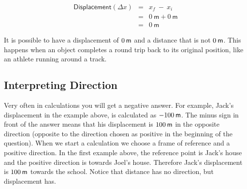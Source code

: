 \begin{minipage}{0.5\textwidth}
\begin{eqnarray*}
\mathsf{Displacement} (\Delta x) &=& x_f~ - ~ x_i\\
&=&0\ \mathsf{m} + 0\ \mathsf{m}\\
&=&0\ \mathsf{m}
\end{eqnarray*}
\end{minipage} 
      \label{m38788*id63886}It is possible to have a displacement of $0\phantom{\rule{2pt}{0ex}}\mathsf{m}$ and a distance that is not $0\phantom{\rule{2pt}{0ex}}\mathsf{m}$. This happens when an object completes a round trip back to its original position, like an athlete running around a track.\par 
      \label{m38788*uid18}
            \subsection*{Interpreting Direction}
            \nopagebreak
        \label{m38788*id63901}Very often in calculations you will get a negative answer. For example, Jack's displacement in the example above, is calculated as $-100\phantom{\rule{2pt}{0ex}}\mathsf{m}$. The minus sign in front of the answer means that his displacement is $100\phantom{\rule{2pt}{0ex}}\mathsf{m}$ in the opposite direction (opposite to the direction chosen as positive in the beginning of the question). When we start a calculation we choose a frame of reference and a positive direction. In the first example above, the reference point is Jack's house and the positive direction is towards Joel's house. Therefore Jack's displacement is $100\phantom{\rule{2pt}{0ex}}\mathsf{m}$ towards the school. Notice that distance has no direction, but displacement has.\par 
      \label{m38788*uid19}
